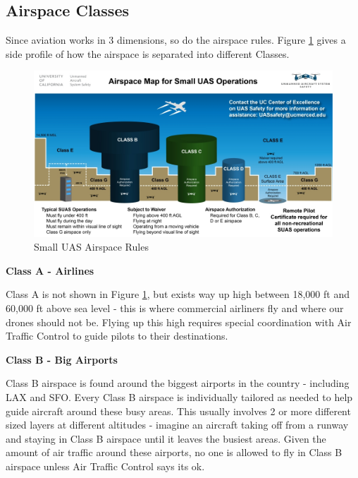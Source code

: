 \documentclass[
  12pt,
]{book}
\begin{document}
\subsection{Airspace Classes}\label{airspace-classes}

Since aviation works in 3 dimensions, so do the airspace rules. Figure \ref{fig:SUAS-airspace-airspace} gives a side profile of how the airspace is separated into different Classes.

\begin{figure}

{\centering \includegraphics[width=0.9\linewidth]{images/SUAS_airspace_map} 

}

\caption{Small UAS Airspace Rules}\label{fig:SUAS-airspace-airspace}
\end{figure}

\textbf{Class A - Airlines}

Class A is not shown in Figure \ref{fig:SUAS-airspace-airspace}, but exists way up high between 18,000 ft and 60,000 ft above sea level - this is where commercial airliners fly and where our drones should not be. Flying up this high requires special coordination with Air Traffic Control to guide pilots to their destinations.

\textbf{Class B - Big Airports}

Class B airspace is found around the biggest airports in the country - including LAX and SFO. Every Class B airspace is individually tailored as needed to help guide aircraft around these busy areas. This usually involves 2 or more different sized layers at different altitudes - imagine an aircraft taking off from a runway and staying in Class B airspace until it leaves the busiest areas. Given the amount of air traffic around these airports, no one is allowed to fly in Class B airspace unless Air Traffic Control says its ok.
\end{document}
